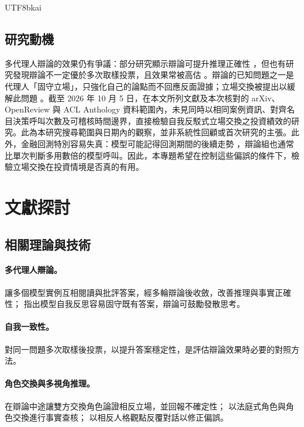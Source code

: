 \documentclass[12pt,a4paper]{article}
\begin{document}
\begin{CJK}{UTF8}{bkai}
\subsection{研究動機}

多代理人辯論的效果仍有爭議：部分研究顯示辯論可提升推理正確性 \citep{du2023debate}，但也有研究發現辯論不一定優於多次取樣投票，且效果常被高估 \citep{smit2023mad,zhang2025stop}。辯論的已知問題之一是代理人「固守立場」，只強化自己的論點而不回應反面證據；立場交換被提出以緩解此問題 \citep{liu2025roleswitch,chowdhury2026proclaim}。截至 2026 年 10 月 5 日，在本文所列文獻及本次核對的 arXiv、OpenReview 與 ACL Anthology 資料範圍內，未見同時以相同案例資訊、對齊名目決策呼叫次數及可稽核時間邊界，直接檢驗自我反駁式立場交換之投資績效的研究。此為本研究搜尋範圍與日期內的觀察，並非系統性回顧或首次研究的主張。此外，金融回測特別容易失真：模型可能記得回測期間的後續走勢 \citep{glasserman2023lookahead,kong2026bias}，辯論組也通常比單次判斷多用數倍的模型呼叫。因此，本專題希望在控制這些偏誤的條件下，檢驗立場交換在投資情境是否真的有用。

\section{文獻探討}

\subsection{相關理論與技術}

\paragraph{多代理人辯論。} \citet{du2023debate} 讓多個模型實例互相閱讀與批評答案，經多輪辯論後收斂，改善推理與事實正確性；\citet{liang2023divergent} 指出模型自我反思容易固守既有答案，辯論可鼓勵發散思考。

\paragraph{自我一致性。} \citet{wang2023selfconsistency} 對同一問題多次取樣後投票，以提升答案穩定性，是評估辯論效果時必要的對照方法。

\paragraph{角色交換與多視角推理。} \citet{liu2025roleswitch} 在辯論中途讓雙方交換角色論證相反立場，並回報不確定性；\citet{chowdhury2026proclaim} 以法庭式角色與角色交換進行事實查核；\citet{chen2026mpt} 以相反人格觀點反覆對話以修正偏誤。


\end{CJK}
\end{document}
